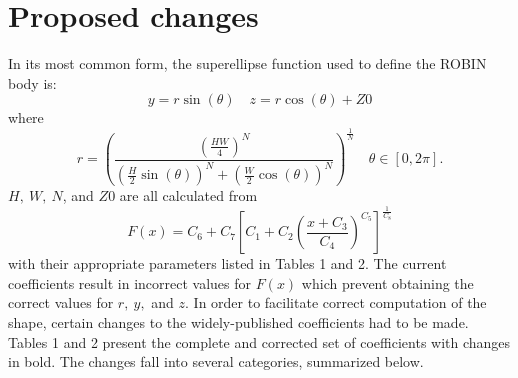 \documentclass{ahs}
\begin{document}
\section{Proposed changes}
 In its most common form, the superellipse function used to define the ROBIN body is:
\begin{equation}
   y=r\sin(\theta) \quad z=r\cos(\theta)+Z0
\end{equation} 
where \begin{equation}
  r=\left(\frac{(\frac{HW}{4})^{N}}{\left(\frac{H}{2}\sin(\theta)\right)^{N}+\left(\frac{W}{2}\cos(\theta)\right)^{N}}\right)^{\frac{1}{N}} \quad \theta\in[0,2\pi].
\end{equation}
$H, \ W, \ N$, and $Z0$ are all calculated from
\begin{equation}
  F(x) = C_{6}+C_{7}\left[C_{1}+C_{2}\left(\frac{x+C_{3}}{C_{4}}\right)^{C_{5}}\right]^{\frac{1}{C_{8}}}
\end{equation}
with their appropriate parameters listed in Tables 1 and 2. The current coefficients result in incorrect values for $F(x)$ which prevent obtaining the correct values for $r, \ y,$ and $z$. In order to facilitate correct computation of the shape, certain changes to the
widely-published coefficients had to be made.
Tables 1 and 2 present the complete and corrected set of coefficients with changes in bold.
The changes fall into several categories, summarized below.
\end{document}
